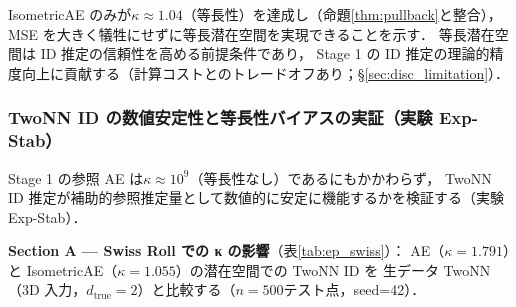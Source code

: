 \documentclass[11pt,a4paper]{jsarticle}
\newcommand{\kap}{\kappa}
\begin{document}
IsometricAE のみが$\kap \approx 1.04$（等長性）を達成し（命題\ref{thm:pullback}と整合），
MSE を大きく犠牲にせずに等長潜在空間を実現できることを示す．
等長潜在空間は ID 推定の信頼性を高める前提条件であり，
Stage 1 の ID 推定の理論的精度向上に貢献する（計算コストとのトレードオフあり；§\ref{sec:disc_limitation}）．

\subsubsection{TwoNN ID の数値安定性と等長性バイアスの実証（実験 Exp-Stab）}\label{sec:exp_ep}

Stage 1 の参照 AE は$\kap \approx 10^9$（等長性なし）であるにもかかわらず，
TwoNN ID 推定が補助的参照推定量として数値的に安定に機能するかを検証する（実験 Exp-Stab）．

\textbf{Section A — Swiss Roll での κ の影響}（表\ref{tab:ep_swiss}）：
AE（$\kap = 1.791$）と IsometricAE（$\kap = 1.055$）の潜在空間での TwoNN ID を
生データ TwoNN（3D 入力，$d_\mathrm{true}=2$）と比較する（$n=500$テスト点，seed=42）．
\end{document}
